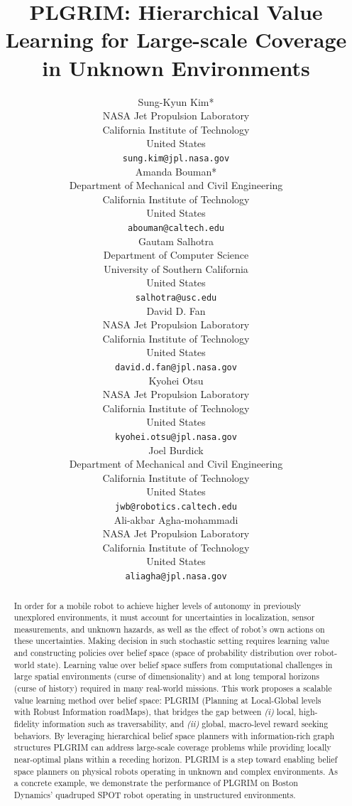 \documentclass{article}
\title{
PLGRIM: Hierarchical Value Learning for Large-scale Coverage in Unknown Environments
}
\author{
  Sung-Kyun Kim*\\
  NASA Jet Propulsion Laboratory\\
  California Institute of Technology\\
  United States\\
  \texttt{sung.kim@jpl.nasa.gov} \\
  \And
  Amanda Bouman*\\
  Department of Mechanical and Civil Engineering\\
  California Institute of Technology\\
  United States\\
  \texttt{abouman@caltech.edu} \\
  \And
  Gautam Salhotra\\
  Department of Computer Science\\
  University of Southern California\\
  United States\\
  \texttt{salhotra@usc.edu} \\
  \And
  David D. Fan\\
  NASA Jet Propulsion Laboratory\\
  California Institute of Technology\\
  United States\\
  \texttt{david.d.fan@jpl.nasa.gov} \\
  \And
  Kyohei Otsu\\
  NASA Jet Propulsion Laboratory\\
  California Institute of Technology\\
  United States\\
  \texttt{kyohei.otsu@jpl.nasa.gov} \\
  \And
  Joel Burdick\\
  Department of Mechanical and Civil Engineering\\
  California Institute of Technology\\
  United States\\
  \texttt{jwb@robotics.caltech.edu} \\
  \And
  Ali-akbar Agha-mohammadi\\
  NASA Jet Propulsion Laboratory\\
  California Institute of Technology\\
  United States\\
  \texttt{aliagha@jpl.nasa.gov} \\
}
\begin{document}
\maketitle


\begin{abstract}
In order for a mobile robot to achieve higher levels of autonomy in previously unexplored environments, it must account for uncertainties in localization, sensor measurements, and unknown hazards, as well as the effect of robot's own actions on these uncertainties. 
%
Making decision in such stochastic setting requires learning value and constructing policies over belief space (space of probability distribution over robot-world state). 
%
Learning value over belief space suffers from computational challenges in large spatial environments (curse of dimensionality) and at long temporal horizons (curse of history) required in many real-world missions. %
This work proposes a scalable value learning method over belief space: PLGRIM (Planning at Local-Global levels with Robust Information roadMaps), that bridges the gap between \textit{(i)} local, high-fidelity information such as traversability, and \textit{(ii)} global, macro-level reward seeking behaviors.
%
By leveraging hierarchical belief space planners with information-rich graph structures PLGRIM can address large-scale coverage problems while providing locally near-optimal plans within a receding horizon.
PLGRIM is a step toward enabling belief space planners %
on physical robots operating in unknown and complex environments. 
%
As a concrete example, we demonstrate the performance of PLGRIM on Boston Dynamics' quadruped SPOT robot operating in unstructured environments.



\end{abstract}
\end{document}

